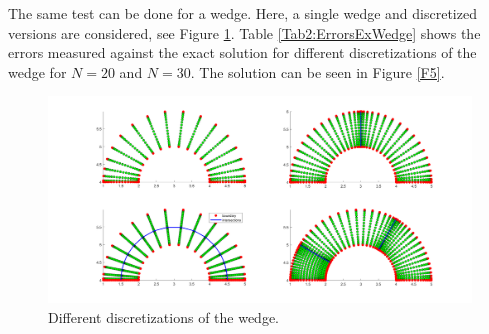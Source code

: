 \documentclass[11pt, a4paper]{article}
\theoremstyle{definition}
\begin{document}
The same test can be done for a wedge. Here, a single wedge and discretized versions are considered, see Figure \ref{F4}. Table \ref{Tab2:ErrorsExWedge} shows the errors measured against the exact solution for different discretizations of the wedge for $N = 20$ and $N = 30$. The solution can be seen in Figure \ref{F5}.
\begin{figure}[h]
	\centering
	\includegraphics[scale=0.35]{WedgeSections.png}
	\caption{Different discretizations of the wedge.} 
	\label{F4}
\end{figure}
\end{document}
